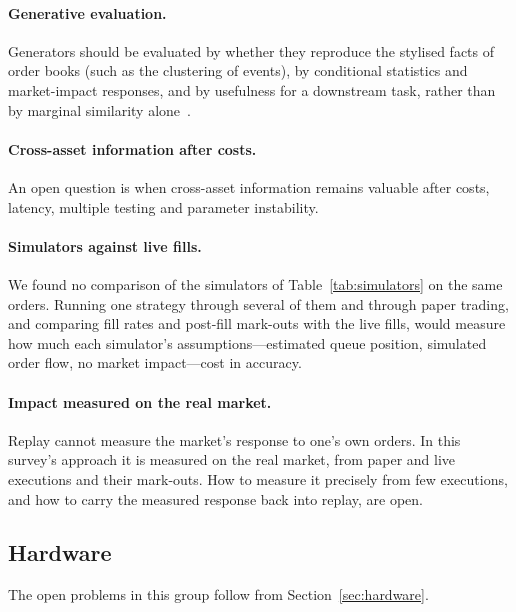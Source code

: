 \paragraph{Generative evaluation.} Generators should be evaluated by whether they reproduce the stylised facts of order
books (such as the clustering of events), by conditional statistics and market-impact responses, and by usefulness
for a downstream task, rather than by marginal similarity alone~\citep{lobbench2025}.

\paragraph{Cross-asset information after costs.} An open question is when cross-asset information remains
valuable after costs, latency, multiple testing and parameter instability.

\paragraph{Simulators against live fills.} We found no comparison of the simulators of Table~\ref{tab:simulators} on the
same orders. Running one strategy through several of them and through paper trading, and comparing fill rates and
post-fill mark-outs with the live fills, would measure how much each simulator's assumptions---estimated queue
position, simulated order flow, no market impact---cost in accuracy.

\paragraph{Impact measured on the real market.} Replay cannot measure the market's response to one's own orders. In this
survey's approach it is measured on the real market, from paper and live executions and their mark-outs. How to measure it
precisely from few executions, and how to carry the measured response back into replay, are open.

\subsection{Hardware}

The open problems in this group follow from Section~\ref{sec:hardware}.

